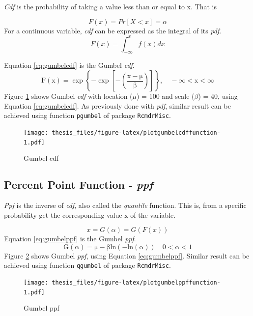 \documentclass[12pt,oneside]{reedthesis}
\begin{document}
\emph{Cdf} is the probability of taking a value less than or equal to x. That is

\[
F(x) = Pr[X < x] = \alpha
\]
For a continuous variable, \emph{cdf} can be expressed as the integral of its \emph{pdf}.
\[
F(x) = \int_{-\infty}^x f(x)dx
\]

Equation \eqref{eq:gumbelcdf} is the Gumbel \emph{cdf}.
\begin{equation}
\mathrm{
        F(x) = \exp\left\{-\exp\left[-\left(\frac{x-\mu}{\beta}\right)\right]\right\}, 
        \quad -\infty < x < \infty
        }
  \label{eq:gumbelcdf}
\end{equation}
Figure \ref{fig:plotgumbelcdffunction} shows Gumbel \emph{cdf} with location (\(\mu\)) = 100 and scale (\(\beta\)) = 40, using Equation \eqref{eq:gumbelcdf}. As previously done with \emph{pdf}, similar result can be achieved using function \texttt{pgumbel} of package \texttt{RcmdrMisc}.

\footnotesize
\begin{figure}
\centering
\texttt{[image: thesis\_files/figure-latex/plotgumbelcdffunction-1.pdf]}
\caption{\label{fig:plotgumbelcdffunction}Gumbel cdf}
\end{figure}
\normalsize

\hypertarget{percent-point-function---ppf}{%
\subsection{\texorpdfstring{Percent Point Function - \emph{ppf}}{Percent Point Function - ppf}}\label{percent-point-function---ppf}}

\emph{Ppf} is the inverse of \emph{cdf}, also called the \emph{quantile} function. This is, from a specific probability get the corresponding value x of the variable.

\[
x = G(\alpha) = G(F(x))
\]
Equation \eqref{eq:gumbelppf} is the Gumbel \emph{ppf}.
\begin{equation}
\mathrm{
        G(\alpha) = \mu-\beta ln(-ln(\alpha))
        \quad 0 < \alpha < 1
        }
  \label{eq:gumbelppf}
\end{equation}
Figure \ref{fig:plotgumbelppffunction} shows Gumbel \emph{ppf}, using Equation \eqref{eq:gumbelppf}. Similar result can be achieved using function \texttt{qgumbel} of package \texttt{RcmdrMisc}.

\footnotesize
\begin{figure}
\centering
\texttt{[image: thesis\_files/figure-latex/plotgumbelppffunction-1.pdf]}
\caption{\label{fig:plotgumbelppffunction}Gumbel ppf}
\end{figure}
\normalsize
\end{document}

